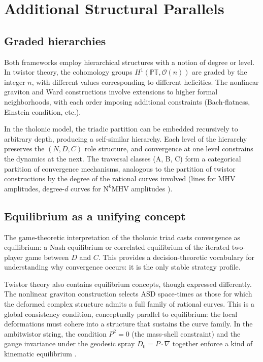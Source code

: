 \documentclass[12pt]{article}
\begin{document}
\section{Additional Structural Parallels}\label{sec:parallels}

\subsection{Graded hierarchies}\label{sec:graded-parallels}

Both frameworks employ hierarchical structures with a notion of degree or level.  In
twistor theory, the cohomology groups $H^1(\mathbb{PT}, \mathcal{O}(n))$ are graded
by the integer $n$, with different values corresponding to different helicities.  The
nonlinear graviton and Ward constructions involve extensions to higher formal
neighborhoods, with each order imposing additional constraints (Bach-flatness, Einstein
condition, etc.).

In the tholonic model, the triadic partition can be embedded recursively to arbitrary
depth, producing a self-similar hierarchy.  Each level of the hierarchy preserves the
$(N, D, C)$ role structure, and convergence at one level constrains the dynamics at the
next.  The traversal classes (A, B, C) form a categorical partition of convergence
mechanisms, analogous to the partition of twistor constructions by the degree of the
rational curves involved (lines for MHV amplitudes, degree-$d$ curves for
$\mathrm{N}^k\mathrm{MHV}$ amplitudes \cite[Section~7a]{ADM17}).

\subsection{Equilibrium as a unifying concept}\label{sec:equilibrium}

The game-theoretic interpretation of the tholonic triad \cite{Mil26c} casts convergence
as equilibrium: a Nash equilibrium or correlated equilibrium of the iterated two-player
game between $D$ and $C$.  This provides a decision-theoretic vocabulary for
understanding why convergence occurs: it is the only stable strategy profile.

Twistor theory also contains equilibrium concepts, though expressed differently.  The
nonlinear graviton construction selects ASD space-times as those for which the deformed
complex structure admits a full family of rational curves.  This is a global consistency
condition, conceptually parallel to equilibrium: the local deformations must cohere into
a structure that sustains the curve family.  In the ambitwistor string, the condition
$P^2 = 0$ (the mass-shell constraint) and the gauge invariance under the geodesic spray
$D_0 = P \cdot \nabla$ together enforce a kind of kinematic equilibrium
\cite[Section~7c]{ADM17}.
\end{document}
